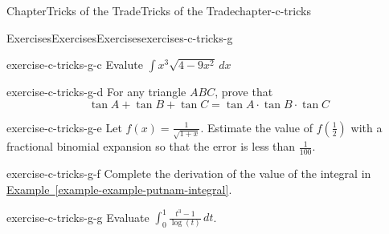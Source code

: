 \documentclass[oneside,10pt,]{book}
\newcommand{\xreffont}{\relax}
\numberwithin{equation}{section}
\begin{document}
\begin{chapterptx}{Chapter}{Tricks of the Trade}{}{Tricks of the Trade}{}{}{chapter-c-tricks}
\begin{exercises-section}{Exercises}{Exercises}{}{Exercises}{}{}{exercises-c-tricks-g}
\begin{divisionexercise}{2}{}{}{exercise-c-tricks-g-c}
Evalute \(\int x^3 \sqrt{4-9x^2} \, dx\)%
\end{divisionexercise}%
\begin{divisionexercise}{3}{}{}{exercise-c-tricks-g-d}%
For any triangle \(ABC\), prove that%
\begin{equation*}
\tan{A}+\tan{B}+\tan{C} = \tan{A}\cdot \tan{B}\cdot \tan{C}
\end{equation*}
%
\end{divisionexercise}%
\begin{divisionexercise}{4}{}{}{exercise-c-tricks-g-e}%
Let \(f(x)=\frac{1}{\sqrt{1+x}}\).  Estimate the value of \(f(\frac{1}{2})\) with a fractional binomial expansion so that the error is less than \(\frac{1}{100}\).%
\end{divisionexercise}%
\begin{divisionexercise}{5}{}{}{exercise-c-tricks-g-f}%
Complete the derivation of the value of the integral in \hyperref[example-example-putnam-integral]{Example~{\xreffont\ref{example-example-putnam-integral}}}.%
\end{divisionexercise}%
\begin{divisionexercise}{6}{}{}{exercise-c-tricks-g-g}%
Evaluate \(\int_0^1 \frac{t^3-1}{\log (t)} \, dt\).%
\end{divisionexercise}%
\end{exercises-section}
\end{chapterptx}
%
%
\typeout{************************************************}
\typeout{************************************************}
%
\end{document}
